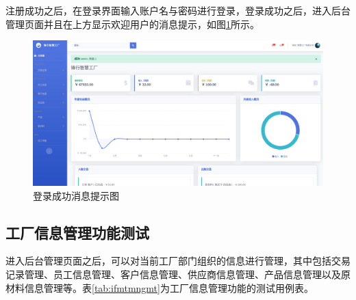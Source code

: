 注册成功之后，在登录界面输入账户名与密码进行登录，登录成功之后，进入后台管理页面并且在上方显示欢迎用户的消息提示，如图\ref{fig:lgsccs}所示。

\begin{figure}[H]
    \centering
    \includegraphics[width=.75\textwidth]{figures/6loginsuscess.png}
    \caption{登录成功消息提示图}
    \label{fig:lgsccs}
\end{figure}

\subsection{工厂信息管理功能测试}

进入后台管理页面之后，可以对当前工厂部门组织的信息进行管理，其中包括交易记录管理、员工信息管理、客户信息管理、供应商信息管理、产品信息管理以及原材料信息管理等。表\ref{tab:ifmtmngmt}为工厂信息管理功能的测试用例表。

